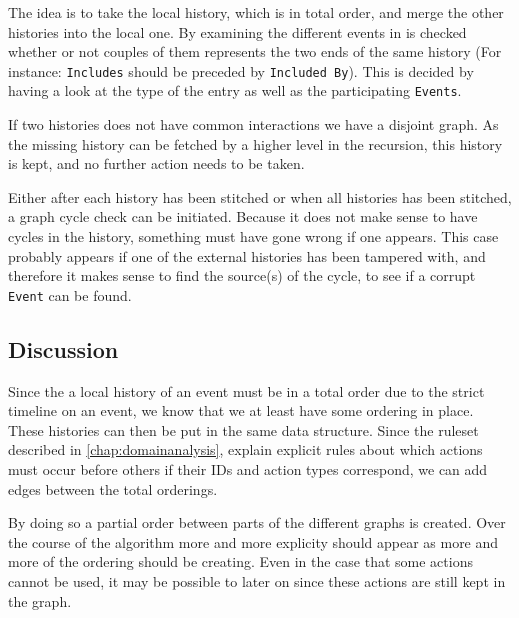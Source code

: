 \newpar The idea is to take the local history, which is in total order, and merge the other histories into the local one. By examining the different events in is checked whether or not couples of them represents the two ends of the same history (For instance: \texttt{Includes} should be preceded by \texttt{Included By}). This is decided by having a look at the type of the entry as well as the participating \texttt{Events}.

\newpar If two histories does not have common interactions we have a disjoint graph. As the missing history can be fetched by a higher level in the recursion, this history is kept, and no further action needs to be taken.

\newpar Either after each history has been stitched or when all histories has been stitched, a graph cycle check can be initiated. Because it does not make sense to have cycles in the history, something must have gone wrong if one appears. This case probably appears if one of the external histories has been tampered with, and therefore it makes sense to find the source(s) of the cycle, to see if a corrupt \texttt{Event} can be found.

\subsection{Discussion} %
Since the a local history of an event must be in a total order due to the strict timeline on an event, we know that we at least have some ordering in place. These histories can then be put in the same data structure. Since the ruleset described in \autoref{chap:domainanalysis}, explain explicit rules about which actions must occur before others if their IDs and action types correspond, we can add edges between the total orderings. 

By doing so a partial order between parts of the different graphs is created. Over the course of the algorithm more and more explicity should appear as more and more of the ordering should be creating. Even in the case that some actions cannot be used, it may be possible to later on since these actions are still kept in the graph. %

